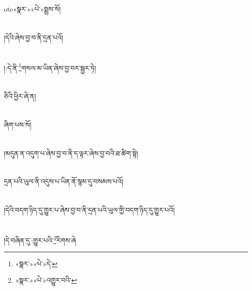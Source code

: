 ote{«སྣར་»«པེ་»སྨྲས་}སོ།\chapter{ }།དེའི་ཞེས་བྱ་བ་ནི་དྲན་པའོ།\chapter{ }།:དེ་ནི་\footnote{«སྣར་»«པེ་»དེ་}གསལ་མ་ཡིན་ཞེས་བྱ་བར་སྦྱར་ཏེ།\chapter{ }ཅིའི་ཕྱིར་ཞེ་ན།\chapter{ }ཞིག་པས་སོ།\chapter{ }།མདུན་ན་འདུག་པ་ཞེས་བྱ་བ་ནི་ད་ལྟར་ཞེས་བྱ་བའི་ཐ་ཚིག་སྟེ།\chapter{ }དྲན་པའི་ཡུལ་ནི་འདུས་པ་ཡིན་ནོ་སྙམ་དུ་བསམས་པའོ།\chapter{ }།དེའི་བདག་ཉིད་དུ་གྱུར་པ་ཞེས་བྱ་བ་ནི་དྲན་པའི་ཡུལ་གྱི་བདག་ཉིད་དུ་གྱུར་པའོ།\chapter{ }།དེ་བཞིན་དུ་:གྱུར་པའི་\footnote{«སྣར་»«པེ་»འགྱུར་བའི་}རིགས་ཞེ